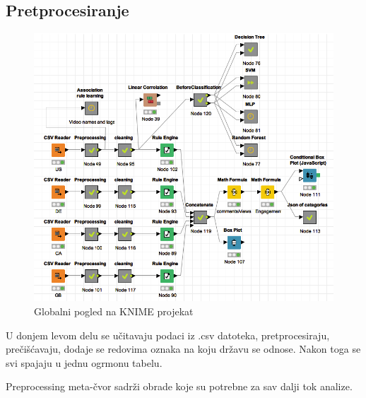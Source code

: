 \documentclass[a4paper]{article}
\theoremstyle{definition}
\begin{document}
\subsection{Pretprocesiranje} \label{pretprocesiranje}

\begin{figure}[h!]
\begin{center}
    \includegraphics[width=1\textwidth]{Global.png}
    \caption{Globalni pogled na KNIME projekat}
    \label{fig:global}
\end{center}
\end{figure}

U donjem levom delu se učitavaju podaci iz .csv datoteka, pretprocesiraju, prečišćavaju, dodaje se redovima oznaka na koju državu se odnose.
Nakon toga se svi spajaju u jednu ogrmonu tabelu.

Preprocessing meta-čvor sadrži obrade koje su potrebne za sav dalji tok analize.
\end{document}
